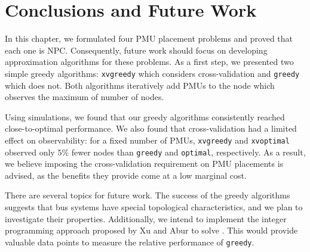 \section{Conclusions and Future Work}
\label{sec:conclude-pmu}

In this chapter, we formulated four PMU placement problems and proved that each one is NPC. 
Consequently, future work should focus on developing approximation algorithms for these problems.  As a first step, we presented two simple greedy algorithms:
{\tt xvgreedy} which considers cross-validation and {\tt greedy} which does not.  Both algorithms iteratively add PMUs to the node which observes the maximum of number of nodes. 

Using simulations, we found that our greedy algorithms consistently reached close-to-optimal performance.  
We also found that cross-validation had a limited effect on observability: for a fixed number of PMUs, {\tt xvgreedy} and {\tt xvoptimal} observed only $5\%$ fewer nodes than
{\tt greedy} and {\tt optimal}, respectively. As a result, we believe imposing the cross-validation requirement on PMU placements is advised, as the benefits they provide come at a low marginal cost.

There are several topics for future work. The success of the greedy algorithms suggests that bus systems have special topological characteristics, 
and we plan to investigate their properties. Additionally, we intend to implement the integer programming approach proposed by Xu and Abur \cite{Xu04} to solve \fulls.  This would
provide valuable data points to measure the relative performance of {\tt greedy}.

